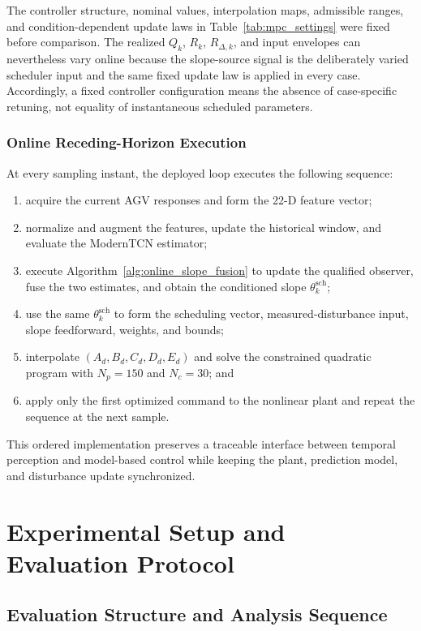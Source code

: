 \documentclass{ieeeaccess}
\begin{document}
The controller structure, nominal values, interpolation maps, admissible ranges, and condition-dependent update laws in Table~\ref{tab:mpc_settings} were fixed before comparison. The realized $Q_k$, $R_k$, $R_{\Delta,k}$, and input envelopes can nevertheless vary online because the slope-source signal is the deliberately varied scheduler input and the same fixed update law is applied in every case. Accordingly, a fixed controller configuration means the absence of case-specific retuning, not equality of instantaneous scheduled parameters.

\subsubsection{Online Receding-Horizon Execution}

At every sampling instant, the deployed loop executes the following sequence:
\begin{enumerate}
\item acquire the current AGV responses and form the 22-D feature vector;
\item normalize and augment the features, update the historical window, and evaluate the ModernTCN estimator;
\item execute Algorithm~\ref{alg:online_slope_fusion} to update the qualified observer, fuse the two estimates, and obtain the conditioned slope $\theta_k^{\mathrm{sch}}$;
\item use the same $\theta^{\mathrm{sch}}_k$ to form the scheduling vector, measured-disturbance input, slope feedforward, weights, and bounds;
\item interpolate $(A_d,B_d,C_d,D_d,E_d)$ and solve the constrained quadratic program with $N_p=150$ and $N_c=30$; and
\item apply only the first optimized command to the nonlinear plant and repeat the sequence at the next sample.
\end{enumerate}
This ordered implementation preserves a traceable interface between temporal perception and model-based control while keeping the plant, prediction model, and disturbance update synchronized.

\section{Experimental Setup and Evaluation Protocol}
\label{sec:experiment_design}

\subsection{Evaluation Structure and Analysis Sequence}
\end{document}
